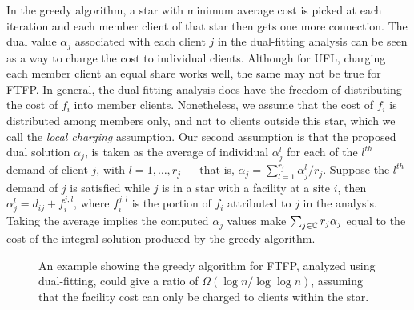 \documentclass[oneside,final]{ucr}
\begin{document}
In the greedy algorithm, a star with minimum average cost is
picked at each iteration and each member client of that star
then gets one more connection. The dual value $\alpha_j$
associated with each client $j$ in the dual-fitting analysis
can be seen as a way to charge the cost to individual
clients. Although for UFL, charging each member client an
equal share works well, the same may not be true for
FTFP. In general, the dual-fitting analysis does have the
freedom of distributing the cost of $f_i$ into member
clients. Nonetheless, we assume that the cost of $f_i$ is
distributed among members only, and not to clients outside
this star, which we call the \emph{local charging}
assumption. Our second assumption is that the proposed dual
solution $\alpha_j$, is taken as the average of individual
$\alpha_j^l$ for each of the $l^{th}$ demand of client $j$,
with $l=1,\ldots,r_j$ --- that is, $\alpha_j =
\sum_{l=1}^{r_j} \alpha_j^l / r_j$. Suppose the $l^{th}$
demand of $j$ is satisfied while $j$ is in a star with a
facility at a site $i$, then $\alpha_j^l = d_{ij} +
f_i^{j,l}$, where $f_i^{j,l}$ is the portion of $f_i$
attributed to $j$ in the analysis. Taking the average
implies the computed $\alpha_j$ values make
$\sum_{j\in\mathbb{C}} r_j \alpha_j$ equal to the cost of
the integral solution produced by the greedy algorithm.

\begin{figure}
  \centering
  \caption[$\Omega(\log n / \log\log n)$ example for
  dual-fitting on {\FTFP}]{An example showing the greedy
    algorithm for FTFP, analyzed using dual-fitting, could
    give a ratio of $\Omega(\log n / \log\log n)$, assuming
    that the facility cost can only be charged to clients
    within the star.}
  \label{fig:greedy_lower_bound}
\end{figure}
\end{document}
